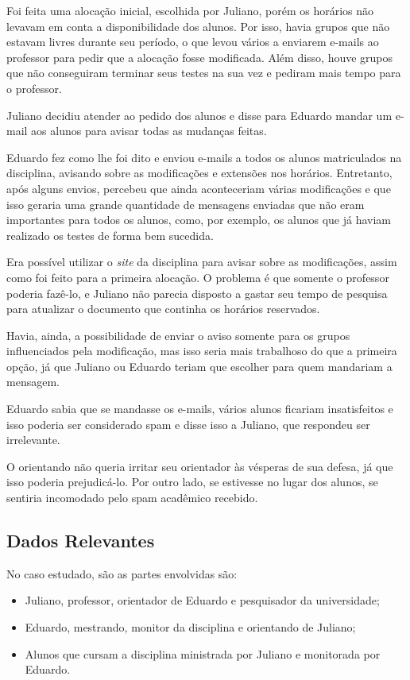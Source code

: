 \documentclass[a4paper,dvipdfm]{article}
\begin{document}
	Foi feita uma alocação inicial, escolhida por Juliano, porém os horários não levavam em conta a disponibilidade dos alunos. 
	Por isso, havia grupos que não estavam livres durante seu período, o que levou vários a enviarem e-mails ao professor para pedir que a alocação fosse modificada.
	Além disso, houve grupos que não conseguiram terminar seus testes na sua vez e pediram mais tempo para o professor.

	Juliano decidiu atender ao pedido dos alunos e disse para Eduardo mandar um e-mail aos alunos para avisar todas as mudanças feitas.
	
	Eduardo fez como lhe foi dito e enviou e-mails a todos os alunos matriculados na disciplina, avisando sobre as modificações e extensões nos horários.
	Entretanto, após alguns envios, percebeu que ainda aconteceriam várias modificações e que isso geraria uma grande quantidade de mensagens enviadas que não eram importantes para todos os alunos, como, por exemplo, os alunos que já haviam realizado os testes de forma bem sucedida.

	Era possível utilizar o \emph{site} da disciplina para avisar sobre as modificações, assim como foi feito para a primeira alocação. 
	O problema é que somente o professor poderia fazê-lo, e Juliano não parecia disposto a gastar seu tempo de pesquisa para atualizar o documento que continha os horários reservados.

	Havia, ainda, a possibilidade de enviar o aviso somente para os grupos influenciados pela modificação, mas isso seria mais trabalhoso do que a primeira opção, já que Juliano ou Eduardo teriam que escolher para quem mandariam a mensagem.
	
	Eduardo sabia que se mandasse os e-mails, vários alunos ficariam insatisfeitos e isso poderia ser considerado spam e disse isso a Juliano, que respondeu ser irrelevante.

	O orientando não queria irritar seu orientador às vésperas de sua defesa, já que isso poderia prejudicá-lo. 
	Por outro lado, se estivesse no lugar dos alunos, se sentiria incomodado pelo spam acadêmico recebido.

\newpage
	\subsection{Dados Relevantes}
		No caso estudado, são as partes envolvidas são:
		\begin{itemize}
			\item Juliano, professor, orientador de Eduardo e pesquisador da universidade;
			\item Eduardo, mestrando, monitor da disciplina e orientando de Juliano;
			\item Alunos que cursam a disciplina ministrada por Juliano e monitorada por Eduardo. 
		\end{itemize}
\end{document}
